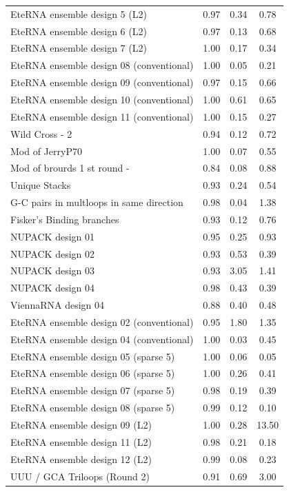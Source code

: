 \documentclass[letter]{bioinfo}
\begin{document}
\begin{center}
\begin{longtable}{l ccc}
EteRNA ensemble design 5 (L2)		&0.97 	&0.34 	&0.78 \\
EteRNA ensemble design 6 (L2)		&0.97 	&0.13 	&0.68 \\
EteRNA ensemble design 7 (L2)		&1.00 	&0.17 	&0.34 \\
EteRNA ensemble design 08 (conventional)		&1.00 	&0.05 	&0.21 \\
EteRNA ensemble design 09 (conventional)		&0.97 	&0.15 	&0.66 \\
EteRNA ensemble design 10 (conventional)		&1.00 	&0.61 	&0.65 \\
EteRNA ensemble design 11 (conventional)		&1.00 	&0.15 	&0.27 \\
Wild Cross - 	2				&0.94 	&0.12 	&0.72 \\
Mod of JerryP70				&1.00 	&0.07 	&0.55 \\
Mod of brourds 1 st round -		&0.84 	&0.08 	&0.88 \\
Unique Stacks					&0.93 	&0.24 	&0.54 \\
G-C pairs in multloops in same direction		&0.98 	&0.04 	&1.38 \\
Fisker's Binding branches		&0.93 	&0.12 	&0.76 \\
NUPACK design 01				&0.95 	&0.25 	&0.93 \\
NUPACK design 02				&0.93 	&0.53 	&0.39 \\
NUPACK design 03				&0.93 	&3.05 	&1.41 \\
NUPACK design 04				&0.98 	&0.43 	&0.39 \\
ViennaRNA design 04			&0.88 	&0.40 	&0.48 \\
EteRNA ensemble design 02 (conventional)		&0.95 	&1.80 	&1.35 \\
EteRNA ensemble design 04 (conventional)		&1.00 	&0.03 	&0.45 \\
EteRNA ensemble design 05 (sparse 5)		&1.00 	&0.06 	&0.05 \\
EteRNA ensemble design 06 (sparse 5)		&1.00 	&0.26 	&0.41 \\
EteRNA ensemble design 07 (sparse 5)		&0.98 	&0.19 	&0.39 \\
EteRNA ensemble design 08 (sparse 5)		&0.99 	&0.12 	&0.10 \\
EteRNA ensemble design 09 (L2)		&1.00 	&0.28 	&13.50 \\
EteRNA ensemble design 11 (L2)		&0.98 	&0.21 	&0.18 \\
EteRNA ensemble design 12 (L2)		&0.99 	&0.08 	&0.23 \\
UUU / GCA Triloops (Round 2)	&0.91 	&0.69 	&3.00 \\

\end{longtable}
\end{center}
\end{document}
